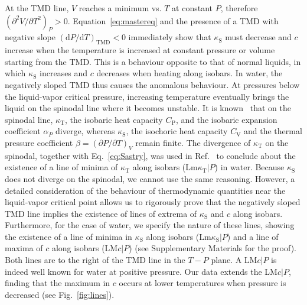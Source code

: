 \documentclass[12pt]{article}
\newcommand{\mrm}{\mathrm}
\newcommand{\kT}{\kappa_\mrm{T}}
\newcommand{\kS}{\kappa_\mrm{S}}
\newcommand{\CP}{C_\mrm{P}}
\newcommand{\CV}{C_\mrm{V}}
\begin{document}
At the TMD line, $V$ reaches a minimum vs. $T$ at constant $P$, therefore $(\partial^2 V/\partial T^2)_P>0$. Equation~\ref{eq:mastereq} and the presence of a TMD with negative slope $(\mrm{d}P/\mrm{d}T)_\mrm{TMD}<0$ immediately show that $\kS$ must decrease and $c$ increase when the temperature is increased at constant pressure or volume starting from the TMD. This is a behaviour opposite to that of normal liquids, in which $\kS$ increases and $c$ decreases when heating along isobars. In water, the negatively sloped TMD thus causes the anomalous behaviour. At pressures below the liquid-vapor critical pressure, increasing temperature eventually brings the liquid on the spinodal line where it becomes unstable. It is known~\cite{Ahlers_chap_1976,Speedy_stabilitylimit_1982} that on the spinodal line, $\kT$, the isobaric heat capacity $\CP$, and the isobaric expansion coefficient $\alpha_P$ diverge, whereas $\kS$, the isochoric heat capacity $\CV$ and the thermal pressure coefficient $\beta=(\partial P/\partial T)_V$ remain finite. The divergence of $\kT$ on the spinodal, together with Eq.~\ref{eq:Sastry}, was used in Ref.~\cite{Sastry_singularityfree_1996} to conclude about the existence of a line of minima of $\kT$ along isobars (Lm$\kT|P$) in water. Because $\kS$ does not diverge on the spinodal, we cannot use the same reasoning. However, a detailed consideration of the behaviour of thermodynamic quantities near the liquid-vapor critical point allows us to rigorously prove that the negatively sloped TMD line implies the existence of lines of extrema of $\kS$ and $c$ along isobars. Furthermore, for the case of water, we specify the nature of these lines, showing the existence of a line of minima in $\kS$ along isobars (Lm$\kS|P$) and a line of maxima of $c$ along isobars (LM$c|P$) (see Supplementary Materials for the proof). Both lines are to the right of the TMD line in the $T-P$ plane. A LM$c|P$ is indeed well known for water at positive pressure. Our data extends the LM$c|P$, finding that the maximum in $c$ occurs at lower temperatures when pressure is decreased (see Fig.~\ref{fig:lines}).
\end{document}
